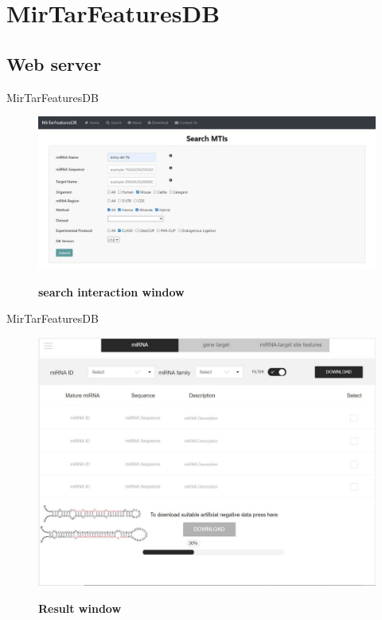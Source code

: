 \documentclass{beamer}
\begin{document}
\section{MirTarFeaturesDB}
\subsection{Web server}
\begin{frame}{MirTarFeaturesDB}


\begin{figure}[h!]
  \caption{\textbf{search interaction window}}
      \includegraphics[width = 1\textwidth]{db figures/search interaction window.jpg}
      \label{fig:search}
          \end{figure}
\end{frame}
\begin{frame}{MirTarFeaturesDB}


\begin{figure}[h!]
  \caption{\textbf{Result window}}
      \includegraphics[width = 1\textwidth]{db figures/result.jpg}
      \label{fig:dbresult}
          \end{figure}
\end{frame}
\end{document}
